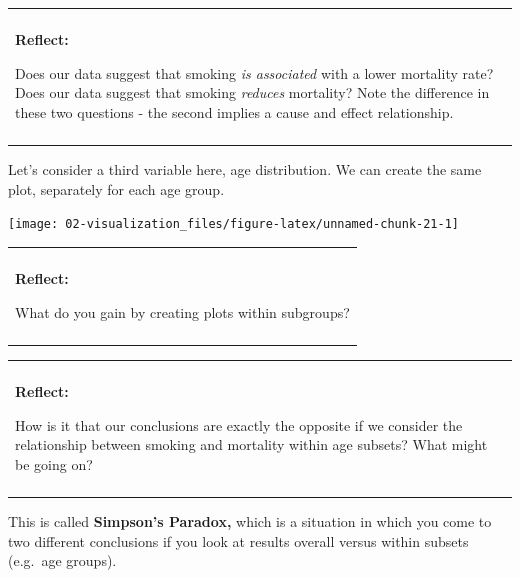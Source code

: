 \documentclass[
]{book}
\newenvironment{Shaded}{\begin{snugshade}}{\end{snugshade}}
\newcommand{\DataTypeTok}[1]{\textcolor[rgb]{0.13,0.29,0.53}{#1}}
\newcommand{\KeywordTok}[1]{\textcolor[rgb]{0.13,0.29,0.53}{\textbf{#1}}}
\newcommand{\NormalTok}[1]{#1}
\newcommand{\OperatorTok}[1]{\textcolor[rgb]{0.81,0.36,0.00}{\textbf{#1}}}
\newcommand{\StringTok}[1]{\textcolor[rgb]{0.31,0.60,0.02}{#1}}
\newenvironment{reflect}
{
    \begin{center}
    
    \begin{tabular}{|p{0.8\textwidth}|}
    \rowcolor{LightBlue}
    \hline\\
    \rowcolor{LightBlue}
    \textbf{Reflect:}
}
{
    \\\rowcolor{LightBlue}
    \\\hline
    \end{tabular} 
    \end{center}
}
\begin{document}
\begin{reflect}
Does our data suggest that smoking \emph{is associated} with a lower
mortality rate? Does our data suggest that smoking \emph{reduces}
mortality? Note the difference in these two questions - the second
implies a cause and effect relationship.
\end{reflect}

Let's consider a third variable here, age distribution. We can create the same plot, separately for each age group.

\begin{Shaded}
\end{Shaded}

\begin{center}\texttt{[image: 02-visualization\_files/figure-latex/unnamed-chunk-21-1]} \end{center}

\begin{reflect}
What do you gain by creating plots within subgroups?
\end{reflect}

\begin{reflect}
How is it that our conclusions are exactly the opposite if we consider
the relationship between smoking and mortality within age subsets? What
might be going on?
\end{reflect}

This is called \textbf{Simpson's Paradox,} which is a situation in which you come to two different conclusions if you look at results overall versus within subsets (e.g.~age groups).
\end{document}
